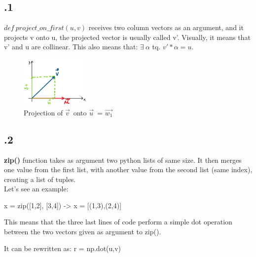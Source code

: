 \documentclass[a4paper]{article}
\begin{document}
\subsection*{.1}
\textbf{$def \ project\_on\_first(u, v)$} receives two column vectors as an argument, and it projects v onto u, the projected vector is usually called v'. Visually, it means that v' and u are collinear. This also means that: $\exists\ \alpha$ tq. $v'*\alpha = u$.
\begin{figure}[H]
\center
\includegraphics[width=0.3\textwidth]{images/projection.PNG}
\caption{Projection of $\vec{v}^{\,}$ onto $\vec{u}^{\,}$ = $\vec{w_{1}}^{\,}$}
\end{figure}
\subsection*{.2}
\textbf{zip()} function takes as argument two python lists of same size. It then merges one value from the first list, with another value from the second list (same index), creating a list of tuples. \\
Let's see an example:
\begin{center}
x = zip([1,2], [3,4]) -> x = [(1,3),(2,4)]
\end{center}
This means that the three last lines of code perform a simple dot operation between the two vectors given as argument to zip().
\begin{center}
It can be rewritten as: r = np.dot(u,v)
\end{center}
\end{document}
